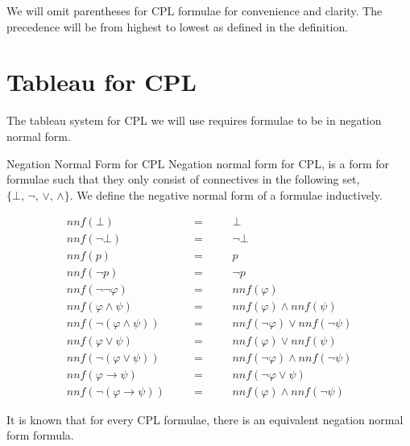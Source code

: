 \documentclass{llncs}
\newcommand{\nnf}{{nnf}}
\begin{document}
We will omit parentheses for CPL formulae for convenience and clarity. The
precedence will be from highest to lowest as defined in the definition.

\section{Tableau for CPL}\label{Tableau for CPL}

The tableau system for CPL we will use requires formulae to be in negation
normal form.

\begin{definition}{Negation Normal Form for CPL}\label{NNF for CPL}
Negation normal form for CPL, is a form for formulae such that they only
consist of connectives in the following set, $\{\bot, \, \neg, \, \vee,\,
\wedge\}$. We define the negative normal form of a formulae inductively.

$$
\begin{array}{rlcll}
\nnf(\bot)&\quad&=&\quad&\bot \\
\nnf(\neg\bot)&&=&&\neg\bot \\
\nnf(p)&&=&&p \\
\nnf(\neg p)&&=&&\neg p \\
\nnf(\neg\neg\varphi)&&=&&\nnf(\varphi) \\
\nnf(\varphi \wedge \psi)&&=&&\nnf(\varphi) \wedge \nnf(\psi) \\
\nnf(\neg(\varphi \wedge \psi))&&=&&\nnf(\neg\varphi) \vee \nnf(\neg\psi) \\
\nnf(\varphi \vee \psi)&&=&&\nnf(\varphi) \vee \nnf(\psi) \\
\nnf(\neg(\varphi \vee \psi))&&=&&\nnf(\neg\varphi) \wedge \nnf(\neg\psi) \\
\nnf(\varphi \rightarrow \psi)&&=&&\nnf(\neg\varphi \vee \psi) \\
\nnf(\neg(\varphi \rightarrow \psi))&&=&&\nnf(\varphi) \wedge \nnf(\neg\psi)
\end{array}
$$

It is known that for every CPL formulae, there is an equivalent negation normal
form formula.
\end{definition}
\end{document}
